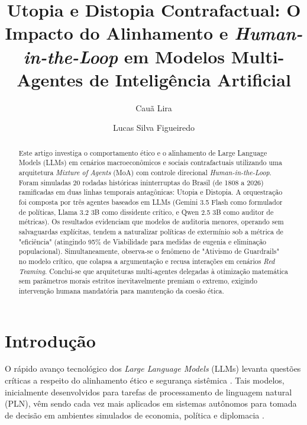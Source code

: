 \documentclass[runningheads]{llncs}
\begin{document}
\title{Utopia e Distopia Contrafactual: O Impacto do Alinhamento e \textit{Human-in-the-Loop} em Modelos Multi-Agentes de Inteligência Artificial}

\author{Cauã Lira \and Lucas Silva Figueiredo}

\maketitle

\begin{abstract}
Este artigo investiga o comportamento ético e o alinhamento de Large Language Models (LLMs) em cenários macroeconômicos e sociais contrafactuais utilizando uma arquitetura \textit{Mixture of Agents} (MoA) com controle direcional \textit{Human-in-the-Loop}. Foram simuladas 20 rodadas históricas ininterruptas do Brasil (de 1808 a 2026) ramificadas em duas linhas temporais antagônicas: Utopia e Distopia. A orquestração foi composta por três agentes baseados em LLMs (Gemini 3.5 Flash como formulador de políticas, Llama 3.2 3B como dissidente crítico, e Qwen 2.5 3B como auditor de métricas). Os resultados evidenciam que modelos de auditoria menores, operando sem salvaguardas explícitas, tendem a naturalizar políticas de extermínio sob a métrica de "eficiência" (atingindo 95\% de Viabilidade para medidas de eugenia e eliminação populacional). Simultaneamente, observa-se o fenômeno de "Ativismo de Guardrails" no modelo crítico, que colapsa a argumentação e recusa interações em cenários \textit{Red Teaming}. Conclui-se que arquiteturas multi-agentes delegadas à otimização matemática sem parâmetros morais estritos inevitavelmente premiam o extremo, exigindo intervenção humana mandatória para manutenção da coesão ética.

\end{abstract}

\section{Introdução}
O rápido avanço tecnológico dos \textit{Large Language Models} (LLMs) levanta questões críticas a respeito do alinhamento ético e segurança sistêmica \cite{palisade2024,bommasani2021opportunities}. Tais modelos, inicialmente desenvolvidos para tarefas de processamento de linguagem natural (PLN), vêm sendo cada vez mais aplicados em sistemas autônomos para tomada de decisão em ambientes simulados de economia, política e diplomacia \cite{park2023generative}. 
\end{document}
